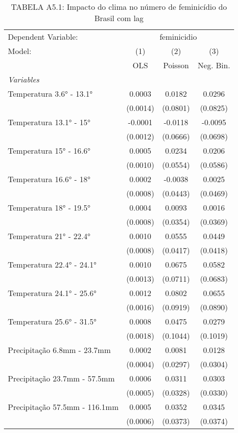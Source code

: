 \documentclass[
]{article}
\begin{document}
\begin{table}[htbp]
\centering
\caption{TABELA A5.1: Impacto do clima no número de feminicídio do Brasil com lag}
\begin{tabular}{lccc}
\tabularnewline\midrule\midrule
Dependent Variable:&\multicolumn{3}{c}{feminicidio}\\
Model:&(1) & (2) & (3)\\
 &  OLS & Poisson & Neg. Bin.\\
\midrule \emph{Variables}&   &   &  \\
Temperatura 3.6° - 13.1° & 0.0003 & 0.0182 & 0.0296\\
  &(0.0014) & (0.0801) & (0.0825)\\
Temperatura 13.1° - 15° & -0.0001 & -0.0118 & -0.0095\\
  &(0.0012) & (0.0666) & (0.0698)\\
Temperatura 15° - 16.6° & 0.0005 & 0.0234 & 0.0206\\
  &(0.0010) & (0.0554) & (0.0586)\\
Temperatura 16.6° - 18° & 0.0002 & -0.0038 & 0.0025\\
  &(0.0008) & (0.0443) & (0.0469)\\
Temperatura 18° - 19.5° & 0.0004 & 0.0093 & 0.0016\\
  &(0.0008) & (0.0354) & (0.0369)\\
Temperatura 21° - 22.4° & 0.0010 & 0.0555 & 0.0449\\
  &(0.0008) & (0.0417) & (0.0418)\\
Temperatura 22.4° - 24.1° & 0.0010 & 0.0675 & 0.0582\\
  &(0.0013) & (0.0711) & (0.0683)\\
Temperatura 24.1° - 25.6° & 0.0012 & 0.0802 & 0.0655\\
  &(0.0016) & (0.0919) & (0.0890)\\
Temperatura 25.6° - 31.5° & 0.0008 & 0.0475 & 0.0279\\
  &(0.0018) & (0.1044) & (0.1019)\\
Precipitação 6.8mm - 23.7mm & 0.0002 & 0.0081 & 0.0128\\
  &(0.0004) & (0.0297) & (0.0304)\\
Precipitação 23.7mm - 57.5mm & 0.0006 & 0.0311 & 0.0303\\
  &(0.0005) & (0.0328) & (0.0330)\\
Precipitação 57.5mm - 116.1mm & 0.0005 & 0.0352 & 0.0345\\
  &(0.0006) & (0.0373) & (0.0374)\\

\end{tabular}
\end{table}
\end{document}
